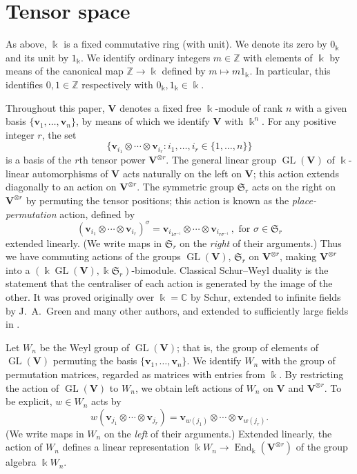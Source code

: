 \documentclass[ALCO,ThmDefs,Unicode,epreuves]{cedram}
\DeclareMathOperator{\GL}{GL}
\DeclareMathOperator{\End}{End}
\newcommand{\Z}{\mathbb{Z}}
\newcommand{\C}{\mathbb{C}}
\newcommand{\Sym}{\mathfrak{S}}
\newcommand{\V}{\mathbf{V}} %
\newcommand{\bv}{\mathbf{v}} %
\begin{document}
\section{Tensor space}\label{sec:bimodules}%
As above, $\Bbbk$ is a fixed commutative ring (with unit). We denote
its zero by $0_\Bbbk$ and its unit by $1_\Bbbk$. We identify ordinary
integers $m \in \Z$ with elements of $\Bbbk$ by means of the canonical
map $\Z \to \Bbbk$ defined by $m \mapsto m 1_\Bbbk$. In particular,
this identifies $0,1 \in \Z$ respectively with $0_\Bbbk, 1_\Bbbk \in
\Bbbk$.

Throughout this paper, $\V$ denotes a fixed free $\Bbbk$-module of
rank $n$ with a given basis $\{\bv_1, \dots, \bv_n\}$, by means of which
we identify $\V$ with $\Bbbk^n$. For any positive integer $r$, the set
\begin{equation}\label{eq:TS-basis}
\{ \bv_{i_1} \otimes \cdots \otimes \bv_{i_r} :
 i_1,\dots, i_r \in \{ 1,
\dots, n\} \}
\end{equation}
is a basis of the $r$th tensor power $\V^{\otimes r}$. The general
linear group $\GL(\V)$ of $\Bbbk$-linear automorphisms of $\V$ acts
naturally on the left on $\V$; this action extends diagonally to an
action on $\V^{\otimes r}$. The symmetric group $\Sym_r$ acts on the
right on $\V^{\otimes r}$ by permuting the tensor positions; this
action is known as the \emph{place-permutation} action, defined by
\begin{equation}\label{eq:PP-action}
(\bv_{i_1} \otimes \cdots \otimes \bv_{i_r})^\sigma = \bv_{i_{1 \sigma^{-1}}}
\otimes \cdots \otimes \bv_{i_{r \sigma^{-1}}} \, , \text{ for } \sigma \in
\Sym_r
\end{equation}
extended linearly. (We write maps in $\Sym_r$ on the \emph{right} of
their arguments.) Thus we have commuting actions of the groups
$\GL(\V)$, $\Sym_r$ on $\V^{\otimes r}$, making $\V^{\otimes r}$ into
a $(\Bbbk \GL(\V), \Bbbk \Sym_r)$-bimodule. Classical Schur--Weyl
duality is the statement that the centraliser of each action is
generated by the image of the other. It was proved originally over
$\Bbbk = \C$ by Schur, extended to infinite fields by J.~A.~Green and
many other authors, and extended to sufficiently large fields in
\cite{Benson-Doty}.


Let $W_n$ be the Weyl group of $\GL(\V)$; that is, the group of elements
of $\GL(\V)$ permuting the basis $\{\bv_1, \dots, \bv_n\}$. We identify
$W_n$ with the group of permutation matrices, regarded as matrices
with entries from $\Bbbk$. By restricting the action of $\GL(\V)$ to
$W_n$, we obtain left actions of $W_n$ on $\V$ and $\V^{\otimes
 r}$. To be explicit, $w \in W_n$ acts by
\begin{equation}\label{eq:W_n-action}
 w (\bv_{j_1} \otimes \cdots \otimes \bv_{j_r}) = \bv_{w(j_1)} \otimes
 \cdots \otimes \bv_{w(j_r)}.
\end{equation}
(We write maps in $W_n$ on the \emph{left} of their arguments.)
Extended linearly, the action of $W_n$ defines a linear representation
$\Bbbk W_n \to \End_\Bbbk( \V^{\otimes r} )$ of the group algebra
$\Bbbk W_n$.
\end{document}

